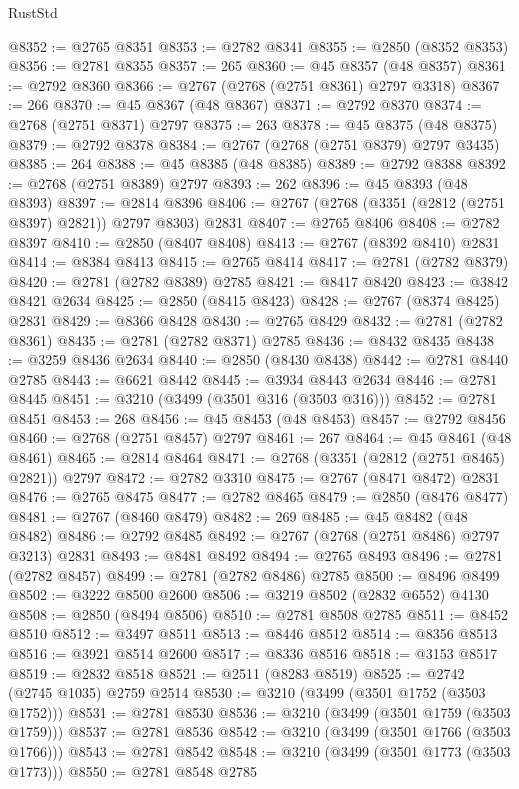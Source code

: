 \begin{lexlean}{RustStd}
\begin{coremodule}
@8352 := @2765 @8351
@8353 := @2782 @8341
@8355 := @2850 (@8352 @8353)
@8356 := @2781 @8355
@8357 := 265
@8360 := @45 @8357 (@48 @8357)
@8361 := @2792 @8360
@8366 := @2767 (@2768 (@2751 @8361) @2797 @3318)
@8367 := 266
@8370 := @45 @8367 (@48 @8367)
@8371 := @2792 @8370
@8374 := @2768 (@2751 @8371) @2797
@8375 := 263
@8378 := @45 @8375 (@48 @8375)
@8379 := @2792 @8378
@8384 := @2767 (@2768 (@2751 @8379) @2797 @3435)
@8385 := 264
@8388 := @45 @8385 (@48 @8385)
@8389 := @2792 @8388
@8392 := @2768 (@2751 @8389) @2797
@8393 := 262
@8396 := @45 @8393 (@48 @8393)
@8397 := @2814 @8396
@8406 := @2767 (@2768 (@3351 (@2812 (@2751 @8397) @2821)) @2797 @8303) @2831
@8407 := @2765 @8406
@8408 := @2782 @8397
@8410 := @2850 (@8407 @8408)
@8413 := @2767 (@8392 @8410) @2831
@8414 := @8384 @8413
@8415 := @2765 @8414
@8417 := @2781 (@2782 @8379)
@8420 := @2781 (@2782 @8389) @2785
@8421 := @8417 @8420
@8423 := @3842 @8421 @2634
@8425 := @2850 (@8415 @8423)
@8428 := @2767 (@8374 @8425) @2831
@8429 := @8366 @8428
@8430 := @2765 @8429
@8432 := @2781 (@2782 @8361)
@8435 := @2781 (@2782 @8371) @2785
@8436 := @8432 @8435
@8438 := @3259 @8436 @2634
@8440 := @2850 (@8430 @8438)
@8442 := @2781 @8440 @2785
@8443 := @6621 @8442
@8445 := @3934 @8443 @2634
@8446 := @2781 @8445
@8451 := @3210 (@3499 (@3501 @316 (@3503 @316)))
@8452 := @2781 @8451
@8453 := 268
@8456 := @45 @8453 (@48 @8453)
@8457 := @2792 @8456
@8460 := @2768 (@2751 @8457) @2797
@8461 := 267
@8464 := @45 @8461 (@48 @8461)
@8465 := @2814 @8464
@8471 := @2768 (@3351 (@2812 (@2751 @8465) @2821)) @2797
@8472 := @2782 @3310
@8475 := @2767 (@8471 @8472) @2831
@8476 := @2765 @8475
@8477 := @2782 @8465
@8479 := @2850 (@8476 @8477)
@8481 := @2767 (@8460 @8479)
@8482 := 269
@8485 := @45 @8482 (@48 @8482)
@8486 := @2792 @8485
@8492 := @2767 (@2768 (@2751 @8486) @2797 @3213) @2831
@8493 := @8481 @8492
@8494 := @2765 @8493
@8496 := @2781 (@2782 @8457)
@8499 := @2781 (@2782 @8486) @2785
@8500 := @8496 @8499
@8502 := @3222 @8500 @2600
@8506 := @3219 @8502 (@2832 @6552) @4130
@8508 := @2850 (@8494 @8506)
@8510 := @2781 @8508 @2785
@8511 := @8452 @8510
@8512 := @3497 @8511
@8513 := @8446 @8512
@8514 := @8356 @8513
@8516 := @3921 @8514 @2600
@8517 := @8336 @8516
@8518 := @3153 @8517
@8519 := @2832 @8518
@8521 := @2511 (@8283 @8519)
@8525 := @2742 (@2745 @1035) @2759 @2514
@8530 := @3210 (@3499 (@3501 @1752 (@3503 @1752)))
@8531 := @2781 @8530
@8536 := @3210 (@3499 (@3501 @1759 (@3503 @1759)))
@8537 := @2781 @8536
@8542 := @3210 (@3499 (@3501 @1766 (@3503 @1766)))
@8543 := @2781 @8542
@8548 := @3210 (@3499 (@3501 @1773 (@3503 @1773)))
@8550 := @2781 @8548 @2785

\end{coremodule}
\end{lexlean}
